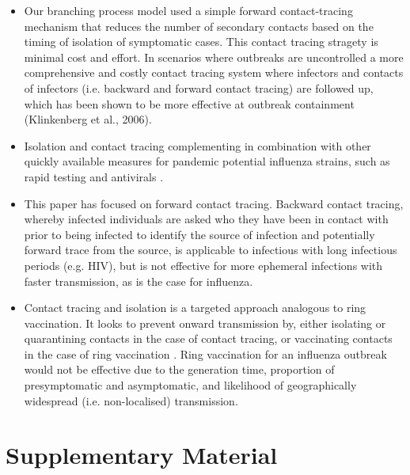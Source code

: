 \documentclass{article}
\begin{document}
\begin{itemize}
\item Our branching process model used a simple forward contact-tracing mechanism that reduces the number of secondary contacts based on the timing of isolation of symptomatic cases. This contact tracing stragety is minimal cost and effort. In scenarios where outbreaks are uncontrolled a more comprehensive and costly contact tracing system where infectors and contacts of infectors (i.e. backward and forward contact tracing) are followed up, which has been shown to be more effective at outbreak containment (Klinkenberg et al., 2006).
\item Isolation and contact tracing complementing in combination with other quickly available measures for pandemic potential influenza strains, such as rapid testing and antivirals \citep{haydenPerspectivesAntiviralUse2001}.
\item This paper has focused on forward contact tracing. Backward contact tracing, whereby infected individuals are asked who they have been in contact with prior to being infected to identify the source of infection and potentially forward trace from the source, is applicable to infectious with long infectious periods (e.g. HIV), but is not effective for more ephemeral infections with faster transmission, as is the case for influenza.
\item Contact tracing and isolation is a targeted approach analogous to ring vaccination. It looks to prevent onward transmission by, either isolating or quarantining contacts in the case of contact tracing, or vaccinating contacts in the case of ring vaccination \citep{kucharskiEffectivenessRingVaccination2016, whittakerQuantifyingImpactBroadly2024}. Ring vaccination for an influenza outbreak would not be effective due to the generation time, proportion of presymptomatic and asymptomatic, and likelihood of geographically widespread (i.e. non-localised) transmission.
\end{itemize}




\clearpage

\section*{Supplementary Material}

\setcounter{figure}{0}
\renewcommand{\thefigure}{S\arabic{figure}}
\end{document}
